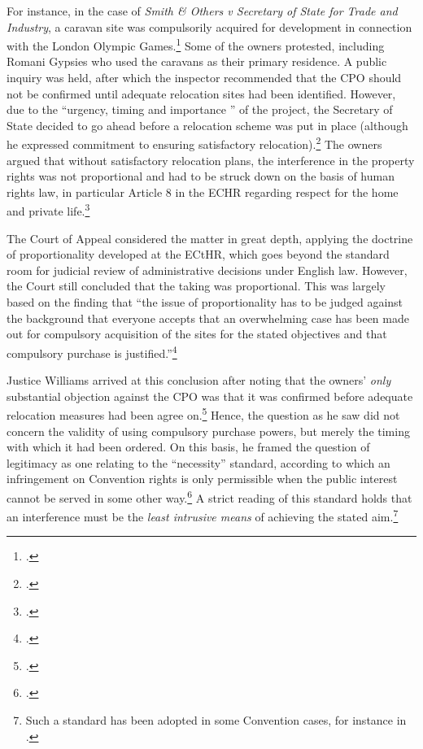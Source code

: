 For instance, in the case of {\it Smith \& Others v Secretary of State for Trade and Industry}, a caravan site was compulsorily acquired for development in connection with the London Olympic Games.\footcite{smith08} Some of the owners protested, including Romani Gypsies who used the caravans as their primary residence. A public inquiry was held, after which the inspector recommended that the CPO should not be confirmed until adequate relocation sites had been identified. However, due to the ``urgency, timing and importance '' of the project, the Secretary of State decided to go ahead before a relocation scheme was put in place (although he expressed commitment to ensuring satisfactory relocation).\footcite[10]{smith08} The owners argued that without satisfactory relocation plans, the interference in the property rights was not proportional and had to be struck down on the basis of human rights law, in particular Article 8 in the ECHR regarding respect for the home and private life.\footcite[27-51]{smith08}

The Court of Appeal considered the matter in great depth, applying the doctrine of proportionality developed at the ECtHR, which goes beyond the standard room for judicial review of administrative decisions under English law. However, the Court still concluded that the taking was proportional. This was largely based on the finding that ``the issue of proportionality has to be judged against the background that everyone accepts that an overwhelming case has been made out for compulsory acquisition of the sites for the stated objectives and that compulsory purchase is justified.''\footcite[42]{smith08} 

Justice Williams arrived at this conclusion after noting that the owners' {\it only} substantial objection against the CPO was that it was confirmed before adequate relocation measures had been agree on.\footcite[42]{smith08} Hence, the question as he saw did not concern the validity of using compulsory purchase powers, but merely the timing with which it had been ordered. On this basis, he framed the question of legitimacy as one relating to the ``necessity'' standard, according to which an infringement on Convention rights is only permissible when the public interest cannot be served in some other way.\footcite[43]{smith08} A strict reading of this standard holds that an interference must be the {\it least intrusive means} of achieving the stated aim.\footnote{Such a standard has been adopted in some Convention cases, for instance in \cite{samaroo01}.}


